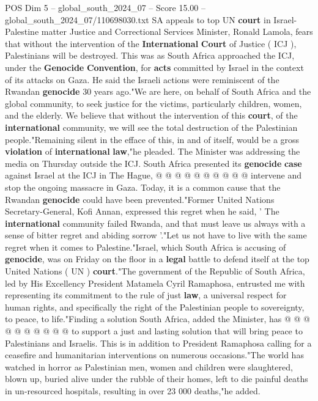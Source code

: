 \begin{textsample}{POS Dim 5 – global\_south\_2024\_07 – Score 15.00 – global\_south\_2024\_07/110698030.txt}  \label{ex:f5_pos_166}
SA appeals to top UN \textbf{court} in Israel-Palestine matter Justice and Correctional Services Minister, Ronald Lamola, fears that without the intervention of the \textbf{International} \textbf{Court} of Justice ( ICJ ), Palestinians will be destroyed.
This was as South Africa approached the ICJ, under the \textbf{Genocide} \textbf{Convention}, for \textbf{acts} committed by Israel in the context of its attacks on Gaza.
He said the Israeli actions were reminiscent of the Rwandan \textbf{genocide} 30 years ago."We are here, on behalf of South Africa and the global community, to seek justice for the victims, particularly children, women, and the elderly.
We believe that without the intervention of this \textbf{court}, of the \textbf{international} community, we will see the total destruction of the Palestinian people."Remaining silent in the efface of this, in and of itself, would be a gross \textbf{violation} of \textbf{international} \textbf{law},"he pleaded.
The Minister was addressing the media on Thursday outside the ICJ.
South Africa presented its \textbf{genocide} \textbf{case} against Israel at the ICJ in The Hague, @ @ @ @ @ @ @ @ @ @ intervene and stop the ongoing massacre in Gaza.
Today, it is a common cause that the Rwandan \textbf{genocide} could have been prevented."Former United Nations Secretary-General, Kofi Annan, expressed this regret when he said, ' The \textbf{international} community failed Rwanda, and that must leave us always with a sense of bitter regret and abiding sorrow '."Let us not have to live with the same regret when it comes to Palestine."Israel, which South Africa is accusing of \textbf{genocide}, was on Friday on the floor in a \textbf{legal} battle to defend itself at the top United Nations ( UN ) \textbf{court}."The government of the Republic of South Africa, led by His Excellency President Matamela Cyril Ramaphosa, entrusted me with representing its commitment to the rule of just \textbf{law}, a universal respect for human rights, and specifically the right of the Palestinian people to sovereignty, to peace, to life."Finding a solution South Africa, added the Minister, has @ @ @ @ @ @ @ @ @ @ to support a just and lasting solution that will bring peace to Palestinians and Israelis.
This is in addition to President Ramaphosa calling for a ceasefire and humanitarian interventions on numerous occasions."The world has watched in horror as Palestinian men, women and children were slaughtered, blown up, buried alive under the rubble of their homes, left to die painful deaths in un-resourced hospitals, resulting in over 23 000 deaths,"he added.

\end{textsample}

